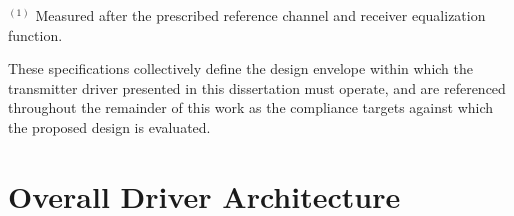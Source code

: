 \begin{table}[H]
    \centering
    \caption{USB 3.2 Gen 2 (10\,Gbps) normative transmitter specifications}
	\label{tab:usb32_tx_specs}
    
    \vspace{1mm}
    \begin{minipage}{1\textwidth}
	\centering
    \footnotesize
    $^{(1)}$ Measured after the prescribed reference channel and receiver equalization function.
    \end{minipage}
\end{table}

These specifications collectively define the design envelope within which the transmitter driver presented in this dissertation must operate, and are referenced throughout the remainder of this work as the compliance targets against which the proposed design is evaluated.

\section{Overall Driver Architecture}\label{sec:overall_driver_architecture}

